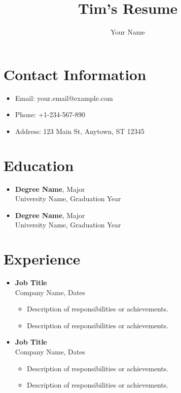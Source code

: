 \documentclass[a4paper,10pt]{article}
\title{Tim's Resume}
\author{Your Name}
\date{} %
\begin{document}
\maketitle

\section*{Contact Information}
\begin{itemize}
    \item Email: your.email@example.com
    \item Phone: +1-234-567-890
    \item Address: 123 Main St, Anytown, ST 12345
\end{itemize}

\section*{Education}
\begin{itemize}
    \item \textbf{Degree Name}, Major \\
    University Name, Graduation Year
    \item \textbf{Degree Name}, Major \\
    University Name, Graduation Year
\end{itemize}

\section*{Experience}
\begin{itemize}
    \item \textbf{Job Title} \\
    Company Name, Dates \\
    \begin{itemize}
        \item Description of responsibilities or achievements.
        \item Description of responsibilities or achievements.
    \end{itemize}
    
    \item \textbf{Job Title} \\
    Company Name, Dates \\
    \begin{itemize}
        \item Description of responsibilities or achievements.
        \item Description of responsibilities or achievements.
    \end{itemize}
\end{itemize}
\end{document}
